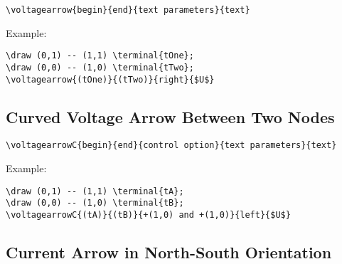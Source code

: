 \documentclass[parskip=full]{scrartcl}
\begin{document}
\begin{verbatim}
\voltagearrow{begin}{end}{text parameters}{text}
\end{verbatim}

Example:\\
\begin{minipage}{0.8\textwidth}
\begin{verbatim}
\draw (0,1) -- (1,1) \terminal{tOne};
\draw (0,0) -- (1,0) \terminal{tTwo};
\voltagearrow{(tOne)}{(tTwo)}{right}{$U$}
\end{verbatim}
\end{minipage}
\begin{minipage}{0.19\textwidth}
\end{minipage}

\subsection{Curved Voltage Arrow Between Two Nodes}

\begin{verbatim}
\voltagearrowC{begin}{end}{control option}{text parameters}{text}
\end{verbatim}

Example:\\
\begin{minipage}{0.8\textwidth}
\begin{verbatim}
\draw (0,1) -- (1,1) \terminal{tA};
\draw (0,0) -- (1,0) \terminal{tB};
\voltagearrowC{(tA)}{(tB)}{+(1,0) and +(1,0)}{left}{$U$}
\end{verbatim}
\end{minipage}
\begin{minipage}{0.19\textwidth}
\end{minipage}

\subsection{Current Arrow in North-South Orientation}
\end{document}
